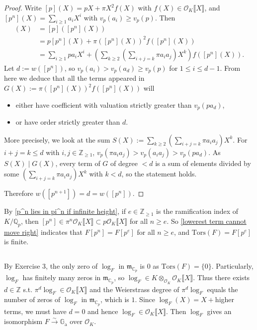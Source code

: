 \documentclass{article}
\theoremstyle{definition}
\theoremstyle{remark}
\newcommand{\C}{\mathbb{C}}
\newcommand{\Q}{\mathbb{Q}}
\newcommand{\Z}{\mathbb{Z}}
\newcommand{\isomto}{\stackrel{\sim}{\rightarrow}} %
\renewcommand{\O}{\mathcal{O}}
\newcommand{\m}{\mathfrak{m}}
\newcommand{\Ga}{\mathbb{G}_{\mathrm{a}}}
\begin{document}
\begin{proof}

    Write $[p](X) = pX + \pi X^2 f(X)$ with $f(X)\in \O_K\llbracket X\rrbracket$, and $[p^n](X) = \sum_{i\ge 1}a_iX^i$ with $v_p(a_i) \ge v_p(p)$.
    Then \begin{align*}
        [p^{n + 1}](X) &= [p]([p^n](X))\\
        &= p[p^n](X) + \pi ([p^n](X))^2 f([p^n](X))\\
        &= \sum_{i\ge 1} pa_iX^i + \left(\sum_{k\ge 2}\left( \sum_{i+j = k}\pi a_ia_j \right)X^k\right) f([p^n](X)).
    \end{align*}
    Let $d := w([p^n])$, so $v_p(a_i) > v_p(a_d) \ge v_p(p)$ for $1\le i \le d-1$.
    From here we deduce that all the terms appeared in $G(X) := \pi ([p^n](X))^2 f([p^n](X))$ will\begin{itemize}
        \item either have coefficient with valuation strictly greater than $v_p(pa_d)$,
        \item or have order strictly greater than $d$.
    \end{itemize}
    More precisely, we look at the sum $S(X) := \sum_{k\ge 2}\left( \sum_{i+j = k}\pi a_ia_j \right)X^k$. For $i + j = k\le d$ with $i, j\in\Z_{\ge 1}$, $v_p(\pi a_ia_j) > v_p(a_ia_j) > v_p(pa_d)$. As $S(X)\mid G(X)$, every term of $G$ of degree $< d$ is a sum of elements divided by some $\left( \sum_{i+j = k}\pi a_ia_j \right)X^k$ with $k < d$, so the statement holds.

    Therefore $w([p^{n+1}]) = d = w([p^n])$.
\end{proof}
By \cref{p^n lies in pi^n if infinite height},
if $e\in\Z_{\ge 1}$ is the ramification index of $K/\Q_p$, then $[p^n]\in\pi^n\O_K\llbracket X\rrbracket\subset p\O_K\llbracket X\rrbracket$ for all $n \ge e$.
So \cref{lowerest term cannot move right} indicates that $F[p^n] = F[p^{e}]$ for all $n \ge e$, and $\mathrm{Tors}(F) = F[p^{e}]$ is finite.


\subsection{}
By Exercise 3, the only zero of $\log_F$ in $\m_{\C_p}$ is $0$ as $\mathrm{Tors}(F) = \{0\}$.
Particularly, $\log_F$ has finitely many zeros in $\m_{\C_p}$, so $\log_F\in K\otimes_{\O_K} \O_K\llbracket X\rrbracket$.
Thus there exists $d\in\Z$ s.t. $\pi^d\log_F\in\O_K\llbracket X\rrbracket$ and the Weierstrass degree of $\pi^d\log_F$ equals the number of zeros of $\log_F$ in $\m_{\C_p}$, which is $1$.
Since $\log_F(X) = X +{}$higher terms, we must have $d = 0$ and hence $\log_F\in \O_K\llbracket X\rrbracket$.
Then $\log_F$ gives an isomorphism $F\isomto \Ga$ over $\O_K$.
\end{document}
